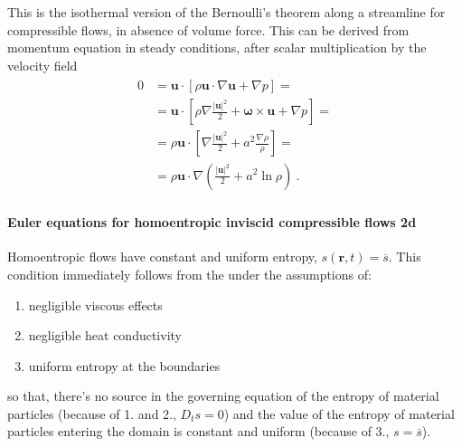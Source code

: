\documentclass[letterpaper,10pt,english]{jupyterBook}
\begin{document}
\sphinxAtStartPar
This is the isothermal version of the Bernoulli’s theorem along a streamline for compressible flows, in absence of volume force. This can be derived from momentum equation in steady conditions, after scalar multiplication by the velocity field
\begin{equation*}
\begin{split}\begin{aligned}
  0 
  & = \mathbf{u} \cdot \left[ \rho \mathbf{u} \cdot \nabla \mathbf{u} + \nabla p \right] = \\
  & = \mathbf{u} \cdot \left[ \rho \nabla \frac{|\mathbf{u}|^2}{2} + \boldsymbol\omega \times \mathbf{u} + \nabla p \right] = \\
  & = \rho \mathbf{u} \cdot \left[ \nabla \frac{|\mathbf{u}|^2}{2} + a^2 \frac{\nabla \rho}{\rho} \right] = \\
  & = \rho \mathbf{u} \cdot \nabla \left( \frac{|\mathbf{u}|^2}{2} + a^2 \ln \rho  \right) \ .
\end{aligned}\end{split}
\end{equation*}

\paragraph{Euler equations for homoentropic inviscid compressible flows \sphinxhyphen{} 2d}
\label{\detokenize{ch/pde/characteristics:euler-equations-for-homoentropic-inviscid-compressible-flows-2d}}
\sphinxAtStartPar
Homoentropic flows have constant and uniform entropy, \(s(\mathbf{r},t) = \overline{s}\). This condition immediately follows from the  under the assumptions of:
\begin{enumerate}
%
\item {} 
\sphinxAtStartPar
negligible viscous effects

\item {} 
\sphinxAtStartPar
negligible heat conductivity

\item {} 
\sphinxAtStartPar
uniform entropy at the boundaries

\end{enumerate}

\sphinxAtStartPar
so that, there’s no source in the governing equation of the entropy of material particles (because of 1. and 2., \(D_t s = 0\)) and the value of the entropy of material particles entering the domain is constant and uniform (because of 3., \(s = \overline{s}\)).
\end{document}

